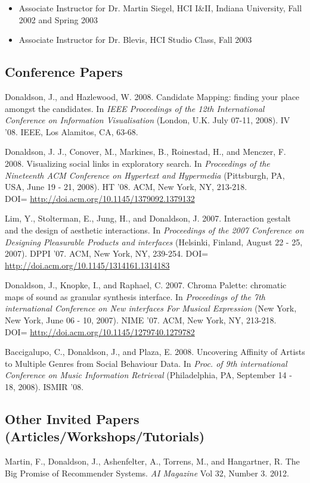 \documentclass[overlapped,line,letterpaper]{res}
\begin{document}
\begin{resume}
\begin{itemize}
\item Associate Instructor for Dr. Martin Siegel, HCI I\&II, Indiana University, Fall 2002 and Spring 2003
\item Associate Instructor for Dr. Blevis, HCI Studio Class, Fall 2003
\end{itemize}


\subsection{\bf Conference Papers}
Donaldson, J., and Hazlewood, W. 2008. Candidate Mapping: finding your place amongst the candidates. In \emph{IEEE Proceedings of the 12th International Conference on Information Visualisation} (London, U.K. July 07-11, 2008). IV '08. IEEE, Los Alamitos, CA, 63-68.

Donaldson, J. J., Conover, M., Markines, B., Roinestad, H., and Menczer, F. 2008. Visualizing social links in exploratory search. In \emph{Proceedings of the Nineteenth ACM Conference on Hypertext and Hypermedia} (Pittsburgh, PA, USA, June 19 - 21, 2008). HT '08. ACM, New York, NY, 213-218. \\ DOI= \url{http://doi.acm.org/10.1145/1379092.1379132}

Lim, Y., Stolterman, E., Jung, H., and Donaldson, J. 2007. Interaction gestalt and the design of aesthetic interactions. In \emph{Proceedings of the 2007 Conference on Designing Pleasurable Products and interfaces} (Helsinki, Finland, August 22 - 25, 2007). DPPI '07. ACM, New York, NY, 239-254.
DOI= \url{http://doi.acm.org/10.1145/1314161.1314183}

Donaldson, J., Knopke, I., and Raphael, C. 2007. Chroma Palette: chromatic maps of sound as granular synthesis interface. In \emph{Proceedings of the 7th international Conference on New interfaces For Musical Expression} (New York, New York, June 06 - 10, 2007). NIME '07. ACM, New York, NY, 213-218. \\DOI= \url{http://doi.acm.org/10.1145/1279740.1279782}

Baccigalupo, C., Donaldson, J., and Plaza, E. 2008. Uncovering Affinity of Artists to Multiple Genres from Social Behaviour Data.  In \emph{Proc. of 9th international Conference on Music Information Retrieval} (Philadelphia, PA, September 14 - 18, 2008). ISMIR '08.


\subsection{\bf Other Invited Papers (Articles/Workshops/Tutorials)}
Martin, F., Donaldson, J., Ashenfelter, A., Torrens, M., and Hangartner, R. The Big Promise of Recommender Systems. \emph{AI Magazine} Vol 32, Number 3. 2012.


\end{resume}
\end{document}
